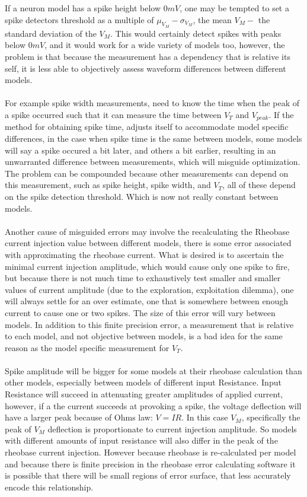     If a neuron model has a spike height below $0mV$, one may be tempted to set a spike detectors threshold as a multiple of $\mu_{V_{M}} - \sigma_{{V_{M}}}$, the mean $V_{M} -$ the standard deviation of the $V_{M}$. This would certainly detect spikes with peaks below $0mV$, and it would work for a wide variety of models too, however, the problem is that because the measurement has a dependency that is relative its self, it is less able to objectively assess waveform differences between  different models.\\
    \\
    For example spike width measurements, need to know the time when the peak of a spike occurred such that it can measure the time between $V_{T}$ and $V_{peak}$. If the method for obtaining spike time, adjusts itself to accommodate model specific differences, in the case when spike time is the same between models, some models will say a spike occured a bit later, and others a bit earlier, resulting in an unwarranted difference between measurements, which will misguide optimization. The problem can be compounded because other measurements can depend on this measurement, such as spike height, spike width, and $V_{T}$, all of these depend on the spike detection threshold. Which is now not really constant between models.\\
    \\
    Another cause of misguided errors may involve the recalculating the Rheobase current injection value between different models, there is some error associated with approximating the rheobase current. What is desired is to ascertain the minimal current injection amplitude, which would cause only one spike to fire, but because there is not much time to exhaustively test smaller and smaller values of current amplitude (due to the exploration, exploitation dilemma), one will always settle for an over estimate, one that is somewhere between enough current to cause one or two spikes. The size of this error will vary between models. In addition to this finite precision error, a measurement that is relative to each model, and not objective between models, is a bad idea for the same reason as the model specific measurement for $V_{T}$.\\
    \\
    Spike amplitude will be bigger for some models at their rheobase calculation than other models, especially between models of different input Resistance. Input Resistance will succeed in attenuating greater amplitudes of applied current, however, if a the current succeeds at provoking a spike, the voltage deflection will have a larger peak because of Ohms law: $V=IR$. In this case $V_{M}$, specifically the peak of $V_{M}$ deflection is proportionate to current injection amplitude. So models with different amounts of input resistance will also differ in the peak of the rheobase current injection. However because rheobase is re-calculated per model and because there is finite precision in the rheobase error calculating software it is possible that there will be small regions of error surface, that less accurately encode this relationship.\\
